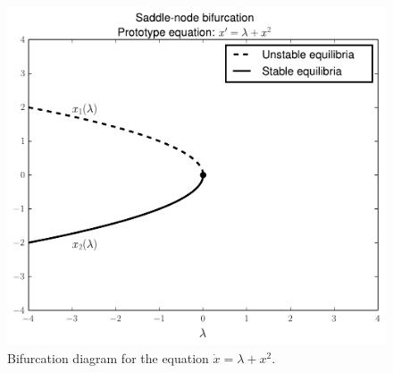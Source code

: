 \begin{figure}[ht]
\centering
\includegraphics[width=\textwidth]{SaddleNBifurcation.pdf}
\caption{Bifurcation diagram for the equation $\dot{x} = \lambda + x^2$.}
\label{bifurcation:sn}
\end{figure}

